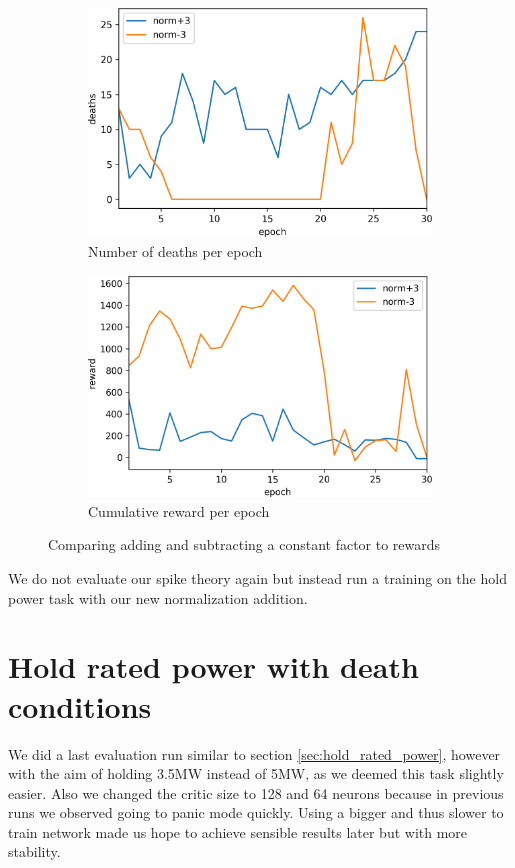 \documentclass[hyperref,final,beleg]{cgvpub}
\begin{document}
\begin{figure}
\centering
\begin{subfigure}{.5\textwidth}
  \centering
  \includegraphics[width=.8\linewidth]{images/death_killcount.png}
  \caption{Number of deaths per epoch}
\end{subfigure}%
\begin{subfigure}{.5\textwidth}
  \centering
  \includegraphics[width=.8\linewidth]{images/death_rewards.png}
  \caption{Cumulative reward per epoch}
\end{subfigure}
\caption{Comparing adding and subtracting a constant factor to rewards}
\label{fig:death_norm}
\end{figure}

We do not evaluate our spike theory again but instead run a training on the hold power task with our new normalization addition.

\section{Hold rated power with death conditions}

We did a last evaluation run similar to section \ref{sec:hold_rated_power}, however with the aim of holding 3.5MW instead of 5MW, as we deemed this task slightly easier. Also we changed the critic size to 128 and 64 neurons because in previous runs we observed going to panic mode quickly. Using a bigger and thus slower to train network made us hope to achieve sensible results later but with more stability.
\end{document}
